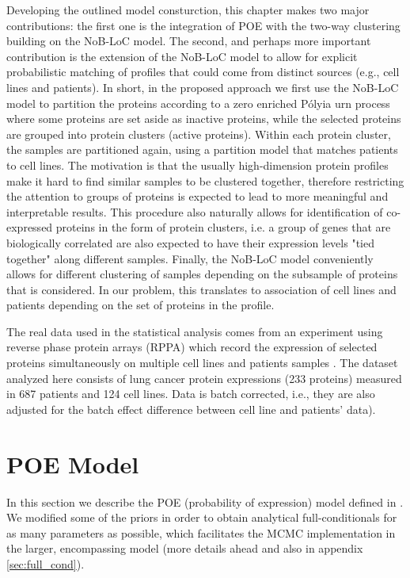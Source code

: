 Developing the outlined model consturction, this chapter makes two major contributions: the first one is the  integration of POE with the two-way clustering building on the NoB-LoC model. The second, and perhaps more important contribution is the extension of the NoB-LoC model to allow for explicit probabilistic matching of profiles that could come from distinct sources (e.g., cell
lines and patients). In short,  in the proposed approach we first use the NoB-LoC model to partition the proteins 
according to a zero enriched P\'olyia urn process where some proteins are set aside as inactive proteins, while the selected proteins are grouped into protein clusters (active proteins). Within each protein cluster, the samples are partitioned again, using a partition model that matches patients to cell lines. The motivation is that the usually high-dimension protein profiles make it hard to find similar samples to be clustered together, therefore restricting the attention to groups of proteins is expected to lead to more meaningful and interpretable results. This procedure also naturally allows for identification of co-expressed proteins in the form of protein clusters, i.e. a group of genes that are biologically correlated are also expected to have their expression levels "tied together" along different samples. Finally, the NoB-LoC model conveniently allows for different clustering of samples depending on the subsample of proteins that is considered. In our problem, this translates to association of cell lines and patients depending on the set of proteins in the profile.

The real data used in the statistical analysis comes from an experiment using reverse phase protein arrays (RPPA)
which record the expression of selected proteins simultaneously on multiple cell lines and patients samples \citep{rppa_ref}. The dataset analyzed here consists of lung cancer protein expressions (233 proteins) measured in 687 patients and 124 cell lines. Data is batch corrected, i.e., they are also adjusted for the batch effect difference between cell line and patients' data).

\section{ POE Model}
\label{sec:poe}

In this section we describe the POE (probability of expression) model defined in \cite{poe_2002}. We modified some of the priors in order to obtain analytical full-conditionals for as many parameters as possible, which facilitates the MCMC implementation in the larger, encompassing model (more details ahead and also in appendix \ref{sec:full_cond}).

